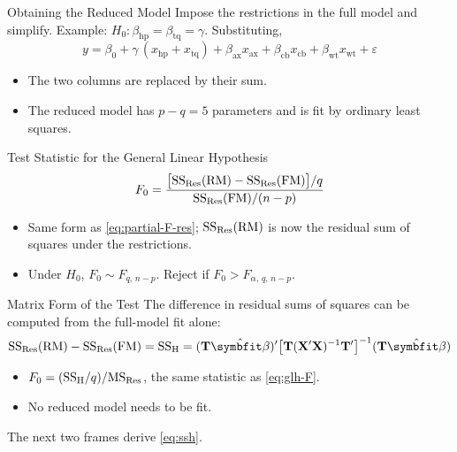 \begin{frame}{Obtaining the Reduced Model}
    Impose the restrictions in the full model and simplify.
    \svspace{0.5em}
    Example: $H_0:\beta_{\mathrm{hp}}=\beta_{\mathrm{tq}}=\gamma$. Substituting,
    \[
    y = \beta_0 + \gamma\,(x_{\mathrm{hp}}+x_{\mathrm{tq}}) + \beta_{\mathrm{ax}}x_{\mathrm{ax}} + \beta_{\mathrm{cb}}x_{\mathrm{cb}} + \beta_{\mathrm{wt}}x_{\mathrm{wt}} + \varepsilon
    \]
    \begin{itemize}
        \item The two columns are replaced by their sum.
        \item The reduced model has $p-q=5$ parameters and is fit by ordinary least squares.
    \end{itemize}
\end{frame}


\begin{frame}{Test Statistic for the General Linear Hypothesis}
    \begin{align}
        F_0 = \frac{\bigl[\mathrm{SS}_{\mathrm{Res}}(\mathrm{RM})-\mathrm{SS}_{\mathrm{Res}}(\mathrm{FM})\bigr]/q}{\mathrm{SS}_{\mathrm{Res}}(\mathrm{FM})/(n-p)}
        \label{eq:glh-F}
    \end{align}
    \begin{itemize}
        \item Same form as \eqref{eq:partial-F-res}; $\mathrm{SS}_{\mathrm{Res}}(\mathrm{RM})$ is now the residual sum of squares under the restrictions.
        \item Under $H_0$, $F_0\sim F_{q,\,n-p}$. Reject if $F_0>F_{\alpha,\,q,\,n-p}$.
    \end{itemize}
\end{frame}


\begin{frame}{Matrix Form of the Test}
    The difference in residual sums of squares can be computed from the full-model fit alone:
    \begin{align}
        \SSRes(\RM)-\SSRes(\FM) = \SSH = (\bT\hat{\bbeta})'\bigl[\bT(\bX'\bX)^{-1}\bT'\bigr]^{-1}(\bT\hat{\bbeta})
        \label{eq:ssh}
    \end{align}
    \begin{itemize}
        \item $F_0=(\mathrm{SS}_{\mathrm{H}}/q)/\mathrm{MS}_{\mathrm{Res}}$, the same statistic as \eqref{eq:glh-F}.
        \item No reduced model needs to be fit.
    \end{itemize}
    \svspace{0.5em}
    The next two frames derive \eqref{eq:ssh}.
\end{frame}


